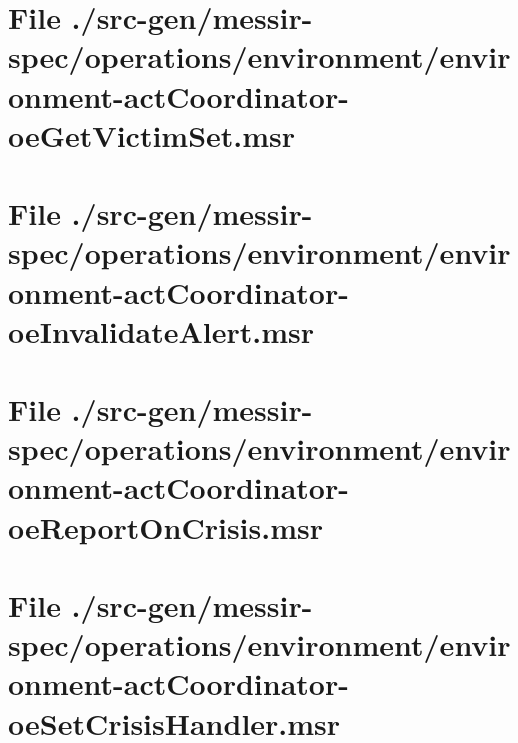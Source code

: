 \section[File /src-gen/messir-spec.../environment-actCoordinator-oeGetVictimSet.msr]{File ./src-gen/messir-spec/operations/environment/environment-actCoordinator-oeGetVictimSet.msr}
\scriptsize

\normalsize
	
\section[File /src-gen/messir-spec.../environment-actCoordinator-oeInvalidateAlert.msr]{File ./src-gen/messir-spec/operations/environment/environment-actCoordinator-oeInvalidateAlert.msr}
\scriptsize

\normalsize
	
\section[File /src-gen/messir-spec.../environment-actCoordinator-oeReportOnCrisis.msr]{File ./src-gen/messir-spec/operations/environment/environment-actCoordinator-oeReportOnCrisis.msr}
\scriptsize

\normalsize
	
\section[File /src-gen/messir-spec.../environment-actCoordinator-oeSetCrisisHandler.msr]{File ./src-gen/messir-spec/operations/environment/environment-actCoordinator-oeSetCrisisHandler.msr}
\scriptsize

\normalsize
	

